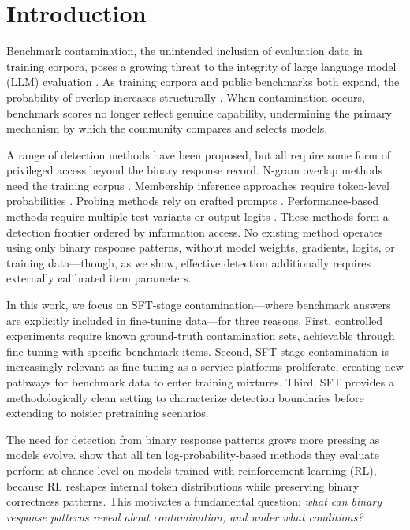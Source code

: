 \section{Introduction}\label{sec:introduction}

Benchmark contamination, the unintended inclusion of evaluation data in training corpora, poses a growing threat to the integrity of large language model (LLM) evaluation \citep{dodge2021, magar2022, sainz2023}.
As training corpora and public benchmarks both expand, the probability of overlap increases structurally \citep{jacovi2023, chang2024survey}.
When contamination occurs, benchmark scores no longer reflect genuine capability, undermining the primary mechanism by which the community compares and selects models.

A range of detection methods have been proposed, but all require some form of privileged access beyond the binary response record.
N-gram overlap methods need the training corpus \citep{dodge2021, magar2022}.
Membership inference approaches require token-level probabilities \citep{minkprob2024, deng2024}.
Probing methods rely on crafted prompts \citep{golchin2024, oren2024}.
Performance-based methods require multiple test variants or output logits \citep{constat2024, codec2026}.
These methods form a detection frontier ordered by information access.
No existing method operates using only binary response patterns, without model weights, gradients, logits, or training data---though, as we show, effective detection additionally requires externally calibrated item parameters.

In this work, we focus on SFT-stage contamination---where benchmark answers are explicitly included in fine-tuning data---for three reasons.
First, controlled experiments require known ground-truth contamination sets, achievable through fine-tuning with specific benchmark items.
Second, SFT-stage contamination is increasingly relevant as fine-tuning-as-a-service platforms proliferate, creating new pathways for benchmark data to enter training mixtures.
Third, SFT provides a methodologically clean setting to characterize detection boundaries before extending to noisier pretraining scenarios.

The need for detection from binary response patterns grows more pressing as models evolve.
\citet{wang2025fragility} show that all ten log-probability-based methods they evaluate perform at chance level on models trained with reinforcement learning (RL), because RL reshapes internal token distributions while preserving binary correctness patterns.
This motivates a fundamental question: \emph{what can binary response patterns reveal about contamination, and under what conditions?}

